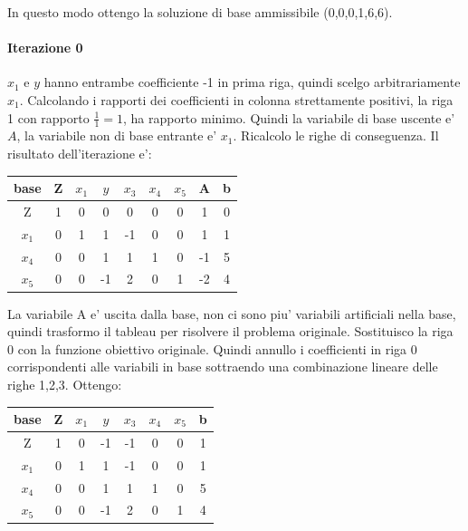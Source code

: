 \documentclass[a4paper,12pt,oneside]{article}
\begin{document}
    In questo modo ottengo la soluzione di base ammissibile (0,0,0,1,6,6).

    \paragraph{Iterazione 0}

    $x_1$ e $y$ hanno entrambe coefficiente -1 in prima riga, quindi scelgo arbitrariamente $x_1$.
    Calcolando i rapporti dei coefficienti in colonna strettamente positivi, la riga 1 con rapporto $\frac 1 1 = 1$, ha rapporto minimo.
    Quindi la variabile di base uscente e' $A$, la variabile non di base entrante e' $x_1$.
    Ricalcolo le righe di conseguenza. Il risultato dell'iterazione e':

    \begin{center}
        \begin{tabular}{||c c c c c c c c c||}
            \hline
            base & Z & $x_1$ & $y$ & $x_3$ & $x_4$ & $x_5$ & A & b \\
            \hline
            \hline
            Z     & 1 &  0 &  0 &  0 & 0 & 0 &  1 &  0 \\
            \hline
            $x_1$ & 0 &  1 &  1 & -1 & 0 & 0 &  1 &  1 \\
            \hline
            $x_4$ & 0 &  0 &  1 &  1 & 1 & 0 & -1 &  5 \\
            \hline
            $x_5$ & 0 &  0 & -1 &  2 & 0 & 1 & -2 &  4 \\
            \hline
        \end{tabular}
    \end{center}

    La variabile A e' uscita dalla base, non ci sono piu' variabili artificiali nella base, quindi trasformo il tableau per risolvere il problema originale.
    Sostituisco la riga 0 con la funzione obiettivo originale. Quindi annullo i coefficienti in riga 0 corrispondenti alle variabili in base sottraendo una combinazione lineare delle righe 1,2,3.
    Ottengo:

    \begin{center}
        \begin{tabular}{||c c c c c c c c||}
            \hline
            base & Z & $x_1$ & $y$ & $x_3$ & $x_4$ & $x_5$ & b \\
            \hline
            \hline
            Z     & 1 &  0 & -1 & -1 & 0 & 0 &  1 \\
            \hline
            $x_1$ & 0 &  1 &  1 & -1 & 0 & 0 &  1 \\
            \hline
            $x_4$ & 0 &  0 &  1 &  1 & 1 & 0 &  5 \\
            \hline
            $x_5$ & 0 &  0 & -1 &  2 & 0 & 1 &  4 \\
            \hline
        \end{tabular}
    \end{center}
\end{document}
